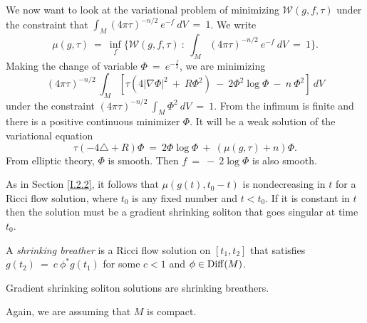 We now want to look at the variational problem of
minimizing ${\mathcal W}(g,f,\tau)$ under the constraint
that $\int_M (4 \pi \tau)^{-n/2} \: e^{-f} \: dV \: = \: 1$.
We write
\begin{equation}
\mu(g, \tau) \: = \: \inf_f \{ {\mathcal W}(g,f,\tau) \: : \:
\int_M (4 \pi \tau)^{-n/2} \: e^{-f} \: dV \: = \: 1\}.
\end{equation}
Making the change of variable $\Phi \: = \: e^{- \frac{f}{2}}$, we are
minimizing
\begin{equation}
(4 \pi \tau)^{-n/2} \: \int_M \left[ \tau (4 |\nabla \Phi|^2 \: + \: R \Phi^2) \: - \:
2 \Phi^2 \log \Phi \: - \: n \: \Phi^2 \right] \: dV
\end{equation}
under the constraint $(4 \pi \tau)^{-n/2} \: \int_M \Phi^2 \: dV \: = \: 1$.
From  \cite[Section 1]{Rothaus} the infimum is finite and
there is a positive
continuous minimizer $\Phi$. It will be a weak solution of the
variational equation
\begin{equation}
\tau (- 4 \triangle + R) \Phi \: = \: 2\Phi \log \Phi \: + \:
(\mu(g, \tau) + n) \Phi.
\end{equation}
From elliptic theory, $\Phi$ is smooth. Then $f \: = \: - \: 2 \log \Phi$
is also smooth.

As in Section \ref{I.2.2}, it follows that
$\mu(g(t), t_0 - t)$ is nondecreasing in $t$ for a Ricci flow
solution, where $t_0$ is any fixed number and $t < t_0$.
If it is constant in $t$ then the solution must be
a gradient shrinking soliton that goes singular at time $t_0$.

\begin{definition}
  \label{def:kl-w-entropy-shrinking-breather-definition}

A {\em shrinking breather} is a Ricci flow solution on $[t_1, t_2]$ that
satisfies $g(t_2) \: = \: c \: \phi^* g(t_1)$ for some
$c < 1$ and $\phi \in \operatorname{Diff}(M)$.
\end{definition}

Gradient shrinking soliton solutions
are shrinking breathers.

Again, we are assuming that $M$ is
compact.

